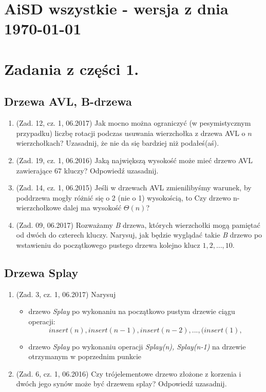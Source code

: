 \documentclass[10pt]{article}%
\begin{document}
\section*{AiSD wszystkie - wersja z dnia \today}


\section*{Zadania z części 1.}


\subsection*{Drzewa AVL, B-drzewa}

\begin{enumerate}

\item (Zad. 12, cz. 1, 06.2017) Jak mocno można ograniczyć (w pesymistycznym przypadku) liczbę rotacji podczas usuwania wierzchołka z drzewa AVL o $n$ wierzchołkach? Uzasadnij, że nie da się bardziej niż podałeś(aś).

\item (Zad. 19, cz. 1, 06.2016) Jaką największą wysokość może mieć drzewo AVL zawierające 67 kluczy? Odpowiedź uzasadnij.

\item (Zad. 14, cz. 1, 06.2015) Jeśli w drzewach AVL zmienilibyśmy warunek, by poddrzewa mogły różnić się o 2 (nie o 1) wysokością, to Czy drzewo n-wierzchołkowe dalej ma wysokość $\Theta(n)$? 

\item (Zad. 09, 06.2017) Rozważamy \emph{B} drzewa, których wierzchołki mogą pamiętać od dwóch do czterech kluczy. Narysuj, jak będzie wyglądać takie \emph{B} drzewo po wstawieniu do początkowego pustego drzewa kolejno klucz $1,2,\ldots,10$.

\end{enumerate}


\subsection*{Drzewa Splay}

\begin{enumerate}

\item (Zad. 3, cz. 1, 06.2017) Narysuj 
\begin{itemize}
	\item drzewo \emph{Splay} po wykonaniu na początkowo pustym drzewie ciągu operacji: $$insert(n),insert(n-1),insert(n-2),...,(insert(1),$$
	\item drzewo \emph{Splay} po wykonaniu operacji \emph{Splay(n), Splay(n-1)} na drzewie otrzymanym w poprzednim punkcie
\end{itemize}

\item (Zad. 6, cz. 1, 06.2016) Czy trójelementowe drzewo złożone z korzenia i dwóch jego synów może być drzewem splay? Odpowiedź uzasadnij.

\end{enumerate}
\end{document}
